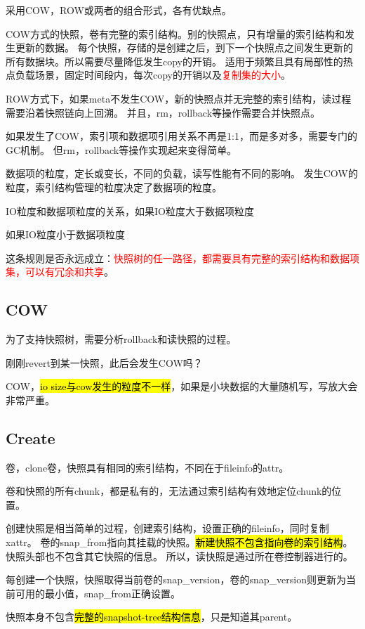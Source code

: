 采用COW，ROW或两者的组合形式，各有优缺点。

COW方式的快照，卷有完整的索引结构。别的快照点，只有增量的索引结构和发生更新的数据。
每个快照，存储的是创建之后，到下一个快照点之间发生更新的所有数据块。所以需要尽量降低发生copy的开销。
适用于频繁且具有局部性的热点负载场景，固定时间段内，每次copy的开销以及\textcolor{red}{复制集的大小}。

ROW方式下，如果meta不发生COW，新的快照点并无完整的索引结构，读过程需要沿着快照链向上回溯。
并且，rm，rollback等操作需要合并快照点。

如果发生了COW，索引项和数据项引用关系不再是1:1，而是多对多，需要专门的GC机制。
但rm，rollback等操作实现起来变得简单。

数据项的粒度，定长或变长，不同的负载，读写性能有不同的影响。
发生COW的粒度，索引结构管理的粒度决定了数据项的粒度。

IO粒度和数据项粒度的关系，如果IO粒度大于数据项粒度

如果IO粒度小于数据项粒度

这条规则是否永远成立：\textcolor{red}{快照树的任一路径，都需要具有完整的索引结构和数据项集，可以有冗余和共享}。

\subsection{COW}

为了支持快照树，需要分析rollback和读快照的过程。

刚刚revert到某一快照，此后会发生COW吗？

COW，\hl{io size与cow发生的粒度不一样}，如果是小块数据的大量随机写，写放大会非常严重。

\subsection{Create}

卷，clone卷，快照具有相同的索引结构，不同在于fileinfo的attr。

卷和快照的所有chunk，都是私有的，无法通过索引结构有效地定位chunk的位置。

创建快照是相当简单的过程，创建索引结构，设置正确的fileinfo，同时复制xattr。
卷的snap\_from指向其挂载的快照。\hl{新建快照不包含指向卷的索引结构}。快照头部也不包含其它快照的信息。
所以，读快照是通过所在卷控制器进行的。

每创建一个快照，快照取得当前卷的snap\_version，卷的snap\_version则更新为当前可用的最小值，snap\_from正确设置。

快照本身不包含\hl{完整的snapshot-tree结构信息}，只是知道其parent。

